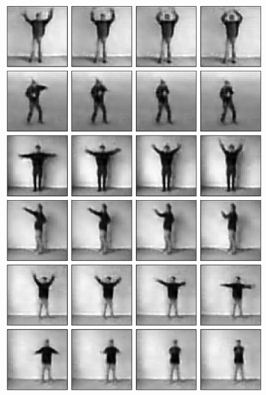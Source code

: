 \begin{frame}
\begin{figure}[h!]
\begin{minipage}[position=r]{0.4\textwidth}
			\includegraphics[scale=0.298]{Bilder/movies_extrapolation}
	\end{minipage}
\end{figure}
\end{frame}

